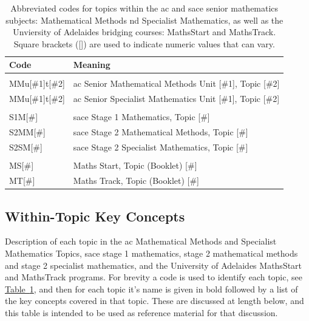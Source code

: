 \documentclass[twoside,12pt,a4paper]{report}
\newcommand{\reftab}[1]{\hyperref[tab:#1]{Table~\ref{tab:#1}}}
\begin{document}
\begin{table}[h]
\caption{Abbreviated codes for topics within the \gls{ac} and \gls{sace} senior mathematics subjects: Mathematical Methods nd Specialist Mathematics, as well as the Unviersity of Adelaides bridging courses: MathsStart and MathsTrack. Square brackets ([]) are used to indicate numeric values that can vary. \label{tab:notation}}
\begin{tabular}{ll}
Code & Meaning \\ \hline
 & \\
MMu[\#1]t[\#2] & \gls{ac} Senior Mathematical Methods Unit [\#1], Topic [\#2] \\
MMu[\#1]t[\#2] & \gls{ac} Senior Specialist Mathematics Unit [\#1], Topic [\#2] \\
 & \\
S1M[\#] & \gls{sace} Stage 1 Mathematics, Topic [\#] \\
S2MM[\#] & \gls{sace} Stage 2 Mathematical Methods, Topic [\#] \\
S2SM[\#] & \gls{sace} Stage 2 Specialist Mathematics, Topic [\#] \\
 & \\
MS[\#] & Maths Start, Topic (Booklet) [\#] \\
MT[\#] & Maths Track, Topic (Booklet) [\#]
\end{tabular}
\end{table}

\subsection{Within-Topic Key Concepts}

Description of each topic in the \gls{ac} Mathematical Methods and Specialist Mathematics Topics, \gls{sace} stage 1 mathematics, stage 2 mathematical methods and stage 2 specialist mathematics, and the University of Adelaides MathsStart and MathsTrack programs. For brevity a code is used to identify each topic, see \reftab{notation}, and then for each topic it's name is given in bold followed by a list of the key concepts covered in that topic. These are discussed at length below, and this table is intended to be used as reference material for that discussion.
\end{document}
